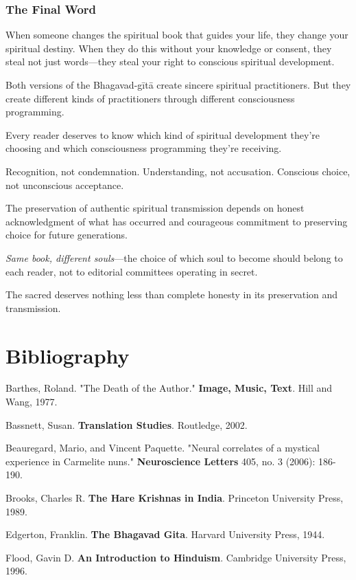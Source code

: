 \documentclass[11pt,twoside]{book}
\begin{document}
\section*{The Final Word}
\label{sec:org241b168}

When someone changes the spiritual book that guides your life, they change your spiritual destiny. When they do this without your knowledge or consent, they steal not just words—they steal your right to conscious spiritual development.

Both versions of the Bhagavad-gītā create sincere spiritual practitioners. But they create different kinds of practitioners through different consciousness programming.

Every reader deserves to know which kind of spiritual development they're choosing and which consciousness programming they're receiving.

Recognition, not condemnation. Understanding, not accusation. Conscious choice, not unconscious acceptance.

The preservation of authentic spiritual transmission depends on honest acknowledgment of what has occurred and courageous commitment to preserving choice for future generations.

\textit{Same book, different souls}—the choice of which soul to become should belong to each reader, not to editorial committees operating in secret.

The sacred deserves nothing less than complete honesty in its preservation and transmission.
\part*{Bibliography}
\label{sec:orgbb9d534}
\thispagestyle{plain}

Barthes, Roland. "The Death of the Author." \textbf{Image, Music, Text}. Hill and Wang, 1977.

Bassnett, Susan. \textbf{Translation Studies}. Routledge, 2002.

Beauregard, Mario, and Vincent Paquette. "Neural correlates of a mystical experience in Carmelite nuns." \textbf{Neuroscience Letters} 405, no. 3 (2006): 186-190.

Brooks, Charles R. \textbf{The Hare Krishnas in India}. Princeton University Press, 1989.

Edgerton, Franklin. \textbf{The Bhagavad Gita}. Harvard University Press, 1944.

Flood, Gavin D. \textbf{An Introduction to Hinduism}. Cambridge University Press, 1996.
\end{document}
